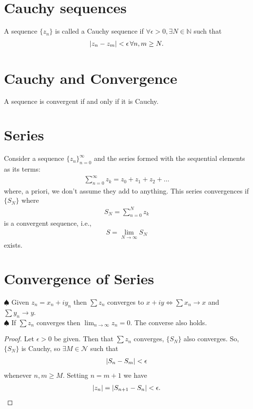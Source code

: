 \documentclass{article}
\theoremstyle{definition}
\newcommand{\N}{\mathcal{N}}
\begin{document}
\section{Cauchy sequences}

A sequence $\{ z_n \}$ is called a Cauchy sequence if $\forall \epsilon > 0, \exists N \in \mathbb{N}$ such that 
\begin{align}
\abs{z_n - z_{m}} < \epsilon \,\forall n,m \geq N.
\end{align}


\section{Cauchy and Convergence}

A sequence is convergent if and only if it is Cauchy.


\section{Series}

Consider a sequence $\{z_n\}^\infty_{n=0}$ and the series formed with the sequential elements as its terms:
\begin{align}
\sum^\infty_{n=0} z_k = z_0 + z_1 + z_2 + \dots
\end{align}
where, a priori, we don't assume they add to anything. This series convergences if $\{ S_N\}$ where
\begin{align}
S_N = \sum^N_{n=0} z_k
\end{align}
is a convergent sequence, i.e.,
\begin{align}
S = \lim_{N\to \infty} S_N
\end{align}
exists. 





\section{Convergence of Series}


\noindent $\spadesuit$ Given $z_n = x_n + iy_n$ then $\sum z_n$ converges to $x + iy \iff \sum x_n \to x$ and $\sum y_n \to y$. \\

\noindent $\spadesuit$ If $\sum z_n$ converges then $\lim_{n\to \infty} z_n = 0$. The converse also holds. 

\begin{proof}
	Let $\epsilon > 0 $ be given. Then that $\sum z_n$ converges, $\{S_N\}$ also converges. So, $\{ S_N\}$ is Cauchy, so $\exists M \in \N$ such that 
	\begin{align}
	\abs{S_n - S_m} < \epsilon
	\end{align}
	whenever $n,m \geq M$. Setting $n = m+1$ we have
	\begin{align}
	\abs{z_n} = \abs{S_{n+1} - S_n} < \epsilon.
	\end{align}
\end{proof} 
\end{document}
